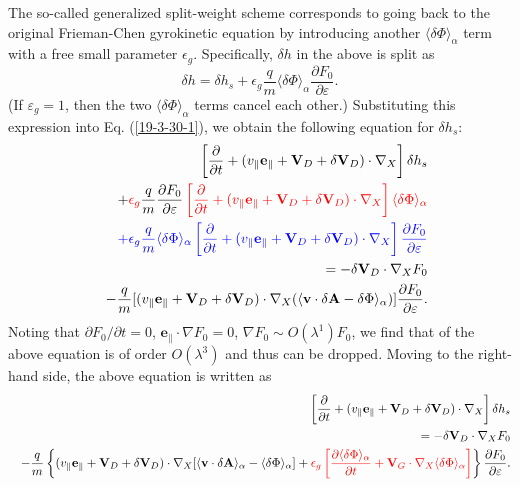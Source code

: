 \documentclass{llncs}
\newcommand{\tmcolor}[2]{{\color{#1}{#2}}}
\begin{document}
The so-called generalized split-weight scheme corresponds to going back to the
original Frieman-Chen gyrokinetic equation by introducing another $\langle
\delta \Phi \rangle_{\alpha}$ term with a free small parameter $\epsilon_g$.
Specifically, $\delta h$ in the above is split as
\begin{equation}
  \delta h = \delta h_s + \epsilon_g \frac{q}{m} \langle \delta \Phi
  \rangle_{\alpha} \frac{\partial F_0}{\partial \varepsilon} .
\end{equation}
(If $\varepsilon_g = 1$, then the two $\langle \delta \Phi \rangle_{\alpha}$
terms cancel each other.) Substituting this expression into Eq.
(\ref{19-3-30-1}), we obtain the following equation for $\delta h_s$:
\begin{eqnarray}
  &  & \left[ \frac{\partial}{\partial t} + (v_{\parallel}
  \mathbf{e}_{\parallel} +\mathbf{V}_D + \delta \mathbf{V}_D) \cdot \nabla_X
  \right] \delta h_s \nonumber\\
  &  & + \tmcolor{red}{\epsilon_g \tmcolor{black}{\frac{q}{m} \frac{\partial
  F_0}{\partial \varepsilon}} \left[ \frac{\partial}{\partial t} +
  (v_{\parallel} \mathbf{e}_{\parallel} +\mathbf{V}_D + \delta \mathbf{V}_D)
  \cdot \nabla_X \right] \langle \delta \Phi \rangle_{\alpha}} \nonumber\\
  &  & \tmcolor{blue}{+ \epsilon_g \frac{q}{m} \langle \delta \Phi
  \rangle_{\alpha} \left[ \frac{\partial}{\partial t} + (v_{\parallel}
  \mathbf{e}_{\parallel} +\mathbf{V}_D + \delta \mathbf{V}_D) \cdot \nabla_X
  \right] \frac{\partial F_0}{\partial \varepsilon}} \nonumber\\
  &  & = - \delta \mathbf{V}_D \cdot \nabla_X F_0 \nonumber\\
  &  & - \frac{q}{m} [(v_{\parallel} \mathbf{e}_{\parallel} +\mathbf{V}_D +
  \delta \mathbf{V}_D) \cdot \nabla_X (\langle \mathbf{v} \cdot \delta
  \mathbf{A}- \delta \Phi \rangle_{\alpha})] \frac{\partial F_0}{\partial
  \varepsilon} .  \label{19-1-10-7m}
\end{eqnarray}
Noting that $\partial F_0 / \partial t = 0$, $\mathbf{e}_{\parallel} \cdot
\nabla F_0 = 0$, $\nabla F_0 \sim O (\lambda^1) F_0$, we find that
\tmcolor{blue}{the third line} of the above equation is of order $O
(\lambda^3)$ and thus can be dropped. Moving \tmcolor{red}{the second line} to
the right-hand side, the above equation is written as
\begin{eqnarray}
  &  & \left[ \frac{\partial}{\partial t} + (v_{\parallel}
  \mathbf{e}_{\parallel} +\mathbf{V}_D + \delta \mathbf{V}_D) \cdot \nabla_X
  \right] \delta h_s \nonumber\\
  &  & = - \delta \mathbf{V}_D \cdot \nabla_X F_0 \nonumber\\
  &  & - \frac{q}{m} \left\{ (v_{\parallel} \mathbf{e}_{\parallel}
  +\mathbf{V}_D + \delta \mathbf{V}_D) \cdot \nabla_X [\langle \mathbf{v}
  \cdot \delta \mathbf{A} \rangle_{\alpha} - \langle \delta \Phi
  \rangle_{\alpha}] + \tmcolor{red}{\epsilon_g \left[ \frac{\partial \langle
  \delta \Phi \rangle_{\alpha}}{\partial t} +\mathbf{V}_G \cdot \nabla_X
  \langle \delta \Phi \rangle_{\alpha} \right]} \right\} \frac{\partial
  F_0}{\partial \varepsilon} .  \label{19-1-10-7}
\end{eqnarray}
\end{document}
